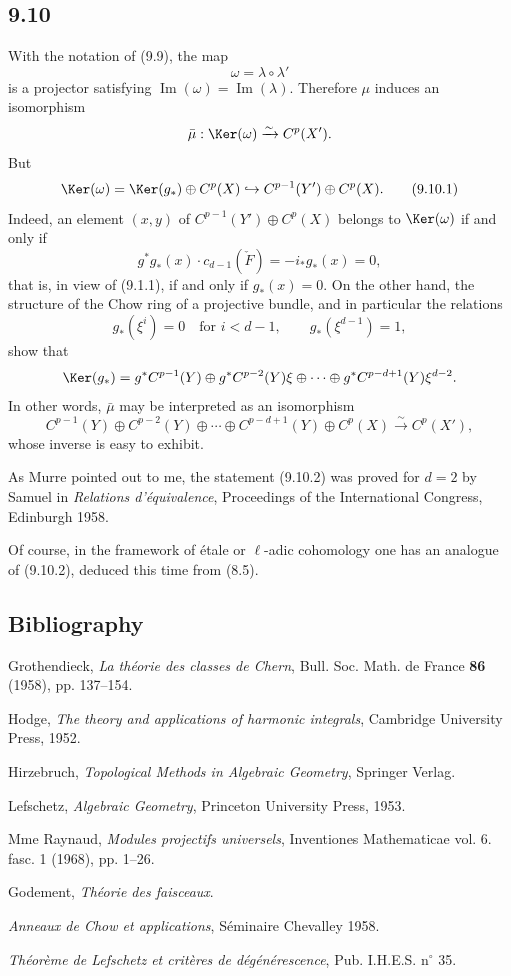\subsection*{9.10}

With the notation of (9.9), the map
\[
\omega=\lambda\circ\lambda'
\]
is a projector satisfying $\operatorname{Im}(\omega)=\operatorname{Im}(\lambda)$. Therefore $\mu$ induces an isomorphism
\[
\bar\mu:\Ker(\omega)\xrightarrow{\sim}C^p(X').
\]
But
\[
\Ker(\omega)=\Ker(g_*)\oplus C^p(X)\hookrightarrow C^{p-1}(Y')\oplus C^p(X).
\tag{9.10.1}
\]
Indeed, an element $(x,y)$ of $C^{p-1}(Y')\oplus C^p(X)$ belongs to $\Ker(\omega)$ if and only if
\[
g^*g_*(x)\cdot c_{d-1}(\check F)=-i_*g_*(x)=0,
\]
that is, in view of (9.1.1), if and only if $g_*(x)=0$. On the other hand, the structure of the Chow ring of a projective bundle, and in particular the relations
\[
g_*(\xi^i)=0\quad\text{for }i<d-1,\qquad g_*(\xi^{d-1})=1,
\]
show that
\[
\Ker(g_*)=g^*C^{p-1}(Y)\oplus g^*C^{p-2}(Y)\xi\oplus\cdots\oplus g^*C^{p-d+1}(Y)\xi^{d-2}.
\]
In other words, $\bar\mu$ may be interpreted as an isomorphism
\[
C^{p-1}(Y)\oplus C^{p-2}(Y)\oplus\cdots\oplus C^{p-d+1}(Y)\oplus C^p(X)
\xrightarrow{\sim}C^p(X'),
\tag{9.10.2}
\]
whose inverse is easy to exhibit.

As Murre pointed out to me, the statement (9.10.2) was proved for $d=2$ by Samuel in \emph{Relations d'équivalence}, Proceedings of the International Congress, Edinburgh 1958.

Of course, in the framework of étale or $\ell$-adic cohomology one has an analogue of (9.10.2), deduced this time from (8.5).

\subsection*{Bibliography}

\begin{enumerate}[label={[\arabic*]}]
\item Grothendieck, \emph{La théorie des classes de Chern}, Bull. Soc. Math. de France \textbf{86} (1958), pp. 137--154.
\item Hodge, \emph{The theory and applications of harmonic integrals}, Cambridge University Press, 1952.
\item Hirzebruch, \emph{Topological Methods in Algebraic Geometry}, Springer Verlag.
\item Lefschetz, \emph{Algebraic Geometry}, Princeton University Press, 1953.
\item Mme Raynaud, \emph{Modules projectifs universels}, Inventiones Mathematicae vol. 6. fasc. 1 (1968), pp. 1--26.
\item[{[TF]}] Godement, \emph{Théorie des faisceaux}.
\item[{[CH]}] \emph{Anneaux de Chow et applications}, Séminaire Chevalley 1958.
\item[{[6]}] \emph{Théorème de Lefschetz et critères de dégénérescence}, Pub. I.H.E.S. n$^\circ$ 35.
\end{enumerate}



